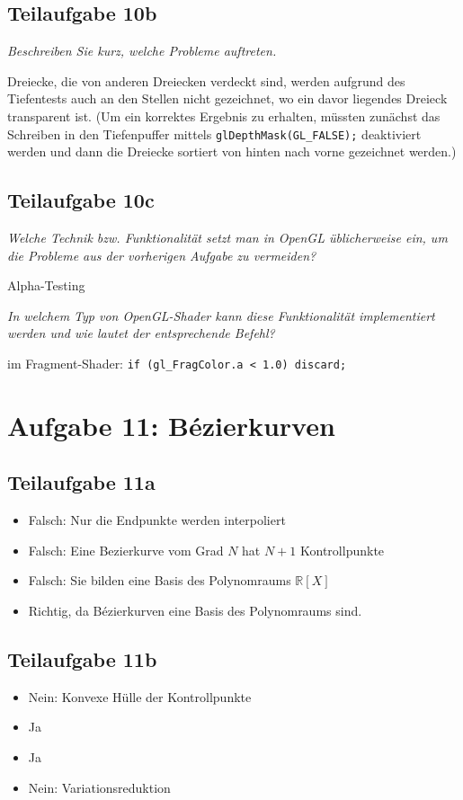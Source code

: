 \documentclass[a4paper]{scrartcl}
\begin{document}
\subsection*{Teilaufgabe 10b}
\textit{Beschreiben Sie kurz, welche Probleme auftreten.}

Dreiecke, die von anderen Dreiecken verdeckt sind, werden aufgrund des Tiefentests auch an den Stellen nicht gezeichnet, wo ein davor liegendes Dreieck transparent ist. (Um ein korrektes Ergebnis zu erhalten, müssten zunächst das Schreiben in den Tiefenpuffer mittels \texttt{glDepthMask(GL_FALSE);} deaktiviert werden und dann die Dreiecke sortiert von hinten nach vorne gezeichnet werden.)

\subsection*{Teilaufgabe 10c}
\textit{Welche Technik bzw. Funktionalität setzt man in OpenGL üblicherweise ein, um die Probleme aus der vorherigen Aufgabe zu vermeiden?}

Alpha-Testing

\textit{In welchem Typ von OpenGL-Shader kann diese Funktionalität implementiert werden und wie lautet der entsprechende Befehl?}

im Fragment-Shader: \texttt{if (gl_FragColor.a < 1.0) discard;}

\section*{Aufgabe 11: Bézierkurven}
\subsection*{Teilaufgabe 11a}
\begin{itemize}
    \item Falsch: Nur die Endpunkte werden interpoliert
    \item Falsch: Eine Bezierkurve vom Grad $N$ hat $N+1$ Kontrollpunkte
    \item Falsch: Sie bilden eine Basis des Polynomraums $\mathbb{R}[X]$
    \item Richtig, da Bézierkurven eine Basis des Polynomraums sind.
\end{itemize}

\subsection*{Teilaufgabe 11b}
\begin{itemize}
    \item Nein: Konvexe Hülle der Kontrollpunkte
    \item Ja
    \item Ja
    \item Nein: Variationsreduktion
\end{itemize}
\end{document}
